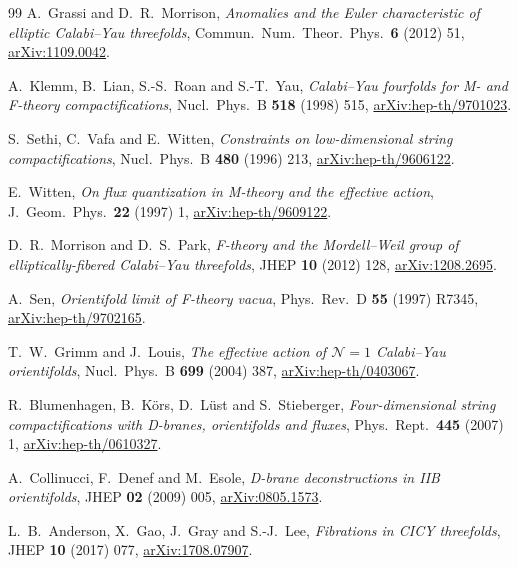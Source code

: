 \documentclass[11pt,a4paper]{article}
\theoremstyle{definition}
\begin{document}
\begin{thebibliography}{99}
A.~Grassi and D.~R.~Morrison,
\emph{Anomalies and the Euler characteristic of elliptic Calabi--Yau
threefolds},
Commun.\ Num.\ Theor.\ Phys.\ \textbf{6} (2012) 51,
\href{https://arxiv.org/abs/1109.0042}{arXiv:1109.0042}.

A.~Klemm, B.~Lian, S.-S.~Roan and S.-T.~Yau,
\emph{Calabi--Yau fourfolds for M- and F-theory compactifications},
Nucl.\ Phys.\ B \textbf{518} (1998) 515,
\href{https://arxiv.org/abs/hep-th/9701023}{arXiv:hep-th/9701023}.

S.~Sethi, C.~Vafa and E.~Witten,
\emph{Constraints on low-dimensional string compactifications},
Nucl.\ Phys.\ B \textbf{480} (1996) 213,
\href{https://arxiv.org/abs/hep-th/9606122}{arXiv:hep-th/9606122}.

E.~Witten,
\emph{On flux quantization in M-theory and the effective action},
J.\ Geom.\ Phys.\ \textbf{22} (1997) 1,
\href{https://arxiv.org/abs/hep-th/9609122}{arXiv:hep-th/9609122}.

D.~R.~Morrison and D.~S.~Park,
\emph{F-theory and the Mordell--Weil group of elliptically-fibered
Calabi--Yau threefolds},
JHEP \textbf{10} (2012) 128,
\href{https://arxiv.org/abs/1208.2695}{arXiv:1208.2695}.

A.~Sen,
\emph{Orientifold limit of F-theory vacua},
Phys.\ Rev.\ D \textbf{55} (1997) R7345,
\href{https://arxiv.org/abs/hep-th/9702165}{arXiv:hep-th/9702165}.

T.~W.~Grimm and J.~Louis,
\emph{The effective action of $\mathcal{N}=1$ Calabi--Yau orientifolds},
Nucl.\ Phys.\ B \textbf{699} (2004) 387,
\href{https://arxiv.org/abs/hep-th/0403067}{arXiv:hep-th/0403067}.

R.~Blumenhagen, B.~K\"ors, D.~L\"ust and S.~Stieberger,
\emph{Four-dimensional string compactifications with D-branes, orientifolds
and fluxes},
Phys.\ Rept.\ \textbf{445} (2007) 1,
\href{https://arxiv.org/abs/hep-th/0610327}{arXiv:hep-th/0610327}.

A.~Collinucci, F.~Denef and M.~Esole,
\emph{D-brane deconstructions in IIB orientifolds},
JHEP \textbf{02} (2009) 005,
\href{https://arxiv.org/abs/0805.1573}{arXiv:0805.1573}.

L.~B.~Anderson, X.~Gao, J.~Gray and S.-J.~Lee,
\emph{Fibrations in CICY threefolds},
JHEP \textbf{10} (2017) 077,
\href{https://arxiv.org/abs/1708.07907}{arXiv:1708.07907}.



\end{thebibliography}
\end{document}
